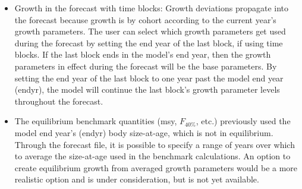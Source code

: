 \begin{itemize}
	\item Growth in the forecast with time blocks: Growth deviations propagate into the forecast because growth is by cohort according to the current year's growth parameters. The user can select which growth parameters get used during the forecast by setting the end year of the last block, if using time blocks. If the last block ends in the model's end year, then the growth parameters in effect during the forecast will be the base parameters. By setting the end year of the last block to one year past the model end year (endyr), the model will continue the last block's growth parameter levels throughout the forecast.
	\item The equilibrium benchmark quantities (\gls{msy}, $F_{40\%}$, etc.) previously used the model end year's (endyr) body size-at-age, which is not in equilibrium. Through the forecast file, it is possible to specify a range of years over which to average the size-at-age used in the benchmark calculations. An option to create equilibrium growth from averaged growth parameters would be a more realistic option and is under consideration, but is not yet available.
\end{itemize}

\hypertarget{tv-sr}{}

